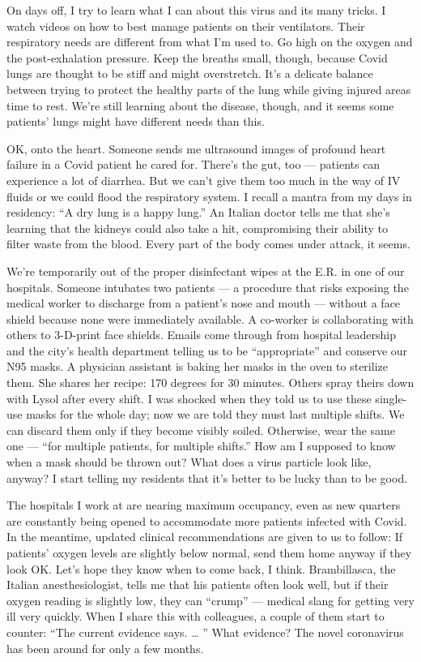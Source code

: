 On days off, I try to learn what I can about this virus and its many
tricks. I watch videos on how to best manage patients on their
ventilators. Their respiratory needs are different from what I'm used
to. Go high on the oxygen and the post-exhalation pressure. Keep the
breaths small, though, because Covid lungs are thought to be stiff and
might overstretch. It's a delicate balance between trying to protect the
healthy parts of the lung while giving injured areas time to rest. We're
still learning about the disease, though, and it seems some patients'
lungs might have different needs than this.

OK, onto the heart. Someone sends me ultrasound images of profound heart
failure in a Covid patient he cared for. There's the gut, too ---
patients can experience a lot of diarrhea. But we can't give them too
much in the way of IV fluids or we could flood the respiratory system. I
recall a mantra from my days in residency: ``A dry lung is a happy
lung.'' An Italian doctor tells me that she's learning that the kidneys
could also take a hit, compromising their ability to filter waste from
the blood. Every part of the body comes under attack, it seems.

We're temporarily out of the proper disinfectant wipes at the E.R. in
one of our hospitals. Someone intubates two patients --- a procedure
that risks exposing the medical worker to discharge from a patient's
nose and mouth --- without a face shield because none were immediately
available. A co-worker is collaborating with others to 3-D-print face
shields. Emails come through from hospital leadership and the city's
health department telling us to be ``appropriate'' and conserve our N95
masks. A physician assistant is baking her masks in the oven to
sterilize them. She shares her recipe: 170 degrees for 30 minutes.
Others spray theirs down with Lysol after every shift. I was shocked
when they told us to use these single-use masks for the whole day; now
we are told they must last multiple shifts. We can discard them only if
they become visibly soiled. Otherwise, wear the same one --- ``for
multiple patients, for multiple shifts.'' How am I supposed to know when
a mask should be thrown out? What does a virus particle look like,
anyway? I start telling my residents that it's better to be lucky than
to be good.

The hospitals I work at are nearing maximum occupancy, even as new
quarters are constantly being opened to accommodate more patients
infected with Covid. In the meantime, updated clinical recommendations
are given to us to follow: If patients' oxygen levels are slightly below
normal, send them home anyway if they look OK. Let's hope they know when
to come back, I think. Brambillasca, the Italian anesthesiologist, tells
me that his patients often look well, but if their oxygen reading is
slightly low, they can ``crump'' --- medical slang for getting very ill
very quickly. When I share this with colleagues, a couple of them start
to counter: ``The current evidence says. \ldots{} '' What evidence? The
novel coronavirus has been around for only a few months.

